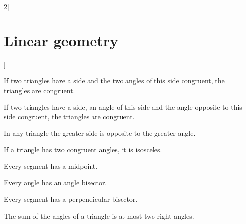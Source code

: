 \documentclass[../../../main.tex]{subfiles}
\begin{document}
\begin{multicols}{2}[\section{Linear geometry}]
\begin{theorem}
\end{theorem}
\begin{theorem}
If two triangles have a side and the two angles of this side congruent, the triangles are congruent.
\end{theorem}
\begin{theorem}
If two triangles have a side, an angle of this side and the angle opposite to this side congruent, the triangles are congruent.
\end{theorem}
\begin{theorem}
In any triangle the greater side is opposite to the greater angle.
\end{theorem}
\begin{theorem}
If a triangle has two congruent angles, it is isosceles.
\end{theorem}
\begin{theorem}
Every segment has a midpoint.
\end{theorem}
\begin{theorem}
Every angle has an angle bisector.
\end{theorem}
\begin{theorem}
Every segment has a perpendicular bisector.
\end{theorem}
\begin{theorem}
The sum of the angles of a triangle is at most two right angles.
\end{theorem}

\end{multicols}
\end{document}
